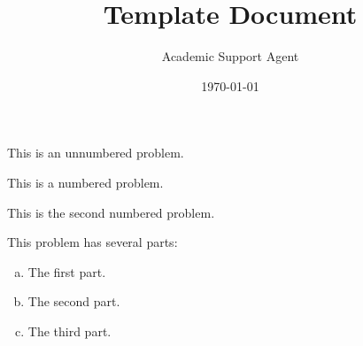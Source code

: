 \documentclass{article}
\title{Template Document}
\author{Academic Support Agent}
\date{\today}
\begin{document}
\maketitle



\prob This is an unnumbered problem. \pspace


\problem This is a numbered problem. \vspace{1.5cm}


\problem This is the second numbered problem. \vfill


\problem This problem has several parts:
	\begin{enumerate}[(a)]
	\item The first part.
	\item The second part. 
	\item The third part. 
	\end{enumerate} \vspace{6cm}
\end{document}
